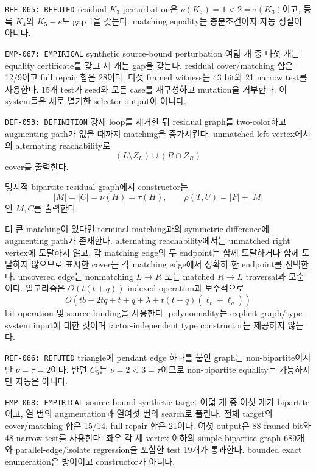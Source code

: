 \documentclass[11pt]{article}
\begin{document}
{\texttt{REF-065: REFUTED}}
residual \(K_3\) perturbation은
\(\nu(K_3)=1<2=\tau(K_3)\)이고, 등록 \(K_4\)와 \(K_5-e\)도 gap 1을
갖는다. matching equality는 충분조건이지 자동 성질이 아니다.

{\texttt{EMP-067: EMPIRICAL}}
synthetic source-bound perturbation 여덟 개 중 다섯 개는 equality
certificate를 갖고 세 개는 gap을 갖는다. residual cover/matching
합은 12/9이고 full repair 합은 28이다. 다섯 framed witness는 43 bit와
21 narrow test를 사용한다. 15개 test가 seed와 모든 case를 재구성하고
mutation을 거부한다. 이 system들은 새로 열거한 selector output이
아니다.

{\texttt{DEF-053: DEFINITION}}
강제 loop를 제거한 뒤 residual graph를 two-color하고 augmenting path가
없을 때까지 matching을 증가시킨다. unmatched left vertex에서의
alternating reachability로
\[
 (L\setminus Z_L)\cup(R\cap Z_R)
\]
cover를 출력한다.

{}
명시적 bipartite residual graph에서 constructor는
\[
 |M|=|C|=\nu(H)=\tau(H),\qquad
 \rho(T,U)=|F|+|M|
\]
인 \(M,C\)를 출력한다.
\begin{claimproof}
더 큰 matching이 있다면 terminal matching과의 symmetric difference에
augmenting path가 존재한다. alternating reachability에서는 unmatched
right vertex에 도달하지 않고, 각 matching edge의 두 endpoint는 함께
도달하거나 함께 도달하지 않으므로 표시한 cover는 각 matching edge에서
정확히 한 endpoint를 선택한다. uncovered edge는 nonmatching
\(L\to R\) 또는 matched \(R\to L\) traversal과 모순이다.
알고리즘은 \(O(t(t+q))\) indexed operation과 보수적으로
\[
 O(tb+2tq+t+q+\lambda+t(t+q)(\ell_t+\ell_q))
\]
bit operation 및 source binding을 사용한다. polynomiality는 explicit
graph/type-system input에 대한 것이며 factor-independent type
constructor는 제공하지 않는다.
\end{claimproof}

{\texttt{REF-066: REFUTED}}
triangle에 pendant edge 하나를 붙인 graph는 non-bipartite이지만
\(\nu=\tau=2\)이다. 반면 \(C_5\)는 \(\nu=2<3=\tau\)이므로
non-bipartite equality는 가능하지만 자동은 아니다.

{\texttt{EMP-068: EMPIRICAL}}
source-bound synthetic target 여덟 개 중 여섯 개가 bipartite이고,
열 번의 augmentation과 열여섯 번의 search로 풀린다. 전체 target의
cover/matching 합은 15/14, full repair 합은 21이다. 여섯 output은 88
framed bit와 48 narrow test를 사용한다. 좌우 각 세 vertex 이하의 simple
bipartite graph 689개와 parallel-edge/isolate regression을 포함한 test
19개가 통과한다. bounded exact enumeration은 방어이고 constructor가
아니다.
\end{document}
